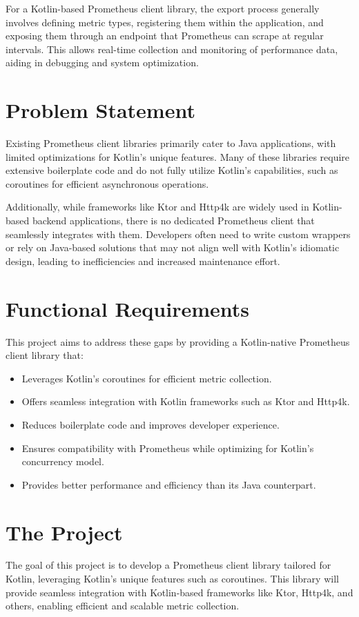 \documentclass[a4paper,twoside,11pt]{article}
\begin{document}
For a Kotlin-based Prometheus client library, the export process generally involves defining metric types, registering them within the application, and exposing them through an endpoint that Prometheus can scrape at regular intervals. This allows real-time collection and monitoring of performance data, aiding in debugging and system optimization.

\section{Problem Statement}
Existing Prometheus client libraries primarily cater to Java applications, with limited optimizations for Kotlin’s unique features. Many of these libraries require extensive boilerplate code and do not fully utilize Kotlin’s capabilities, such as coroutines for efficient asynchronous operations.

Additionally, while frameworks like Ktor and Http4k are widely used in Kotlin-based backend applications, there is no dedicated Prometheus client that seamlessly integrates with them. Developers often need to write custom wrappers or rely on Java-based solutions that may not align well with Kotlin’s idiomatic design, leading to inefficiencies and increased maintenance effort.

\section{Functional Requirements}
This project aims to address these gaps by providing a Kotlin-native Prometheus client library that:
\begin{itemize}
    \item Leverages Kotlin’s coroutines for efficient metric collection.
    \item Offers seamless integration with Kotlin frameworks such as Ktor and Http4k.
    \item Reduces boilerplate code and improves developer experience.
    \item Ensures compatibility with Prometheus while optimizing for Kotlin’s concurrency model.
    \item Provides better performance and efficiency than its Java counterpart.
\end{itemize}

\section{The Project}
The goal of this project is to develop a Prometheus client library tailored for Kotlin, leveraging Kotlin's unique features such as coroutines. This library will provide seamless integration with Kotlin-based frameworks like Ktor, Http4k, and others, enabling efficient and scalable metric collection.
\end{document}
